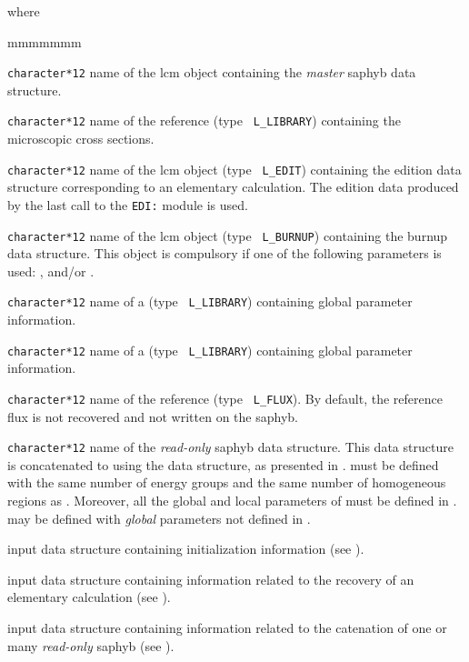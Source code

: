 \noindent where
\begin{ListeDeDescription}{mmmmmmm}

\item[\dusa{SAPNAM}] {\tt character*12} name of the {\sc lcm} object containing the
{\sl master} {\sc saphyb} data structure.

\item[\dusa{HMIC}] {\tt character*12} name of the reference  (type {\tt
L\_LIBRARY}) containing the microscopic cross sections.

\item[\dusa{EDINAM}] {\tt character*12} name of the {\sc lcm} object (type {\tt
L\_EDIT}) containing the {\sc edition} data structure corresponding to an elementary
calculation. The {\sc edition} data produced by the last call to the {\tt EDI:} module
is used.

\item[\dusa{BRNNAM}] {\tt character*12} name of the {\sc lcm} object (type {\tt
L\_BURNUP}) containing the {\sc burnup} data structure. This object is compulsory if one
of the following parameters is used: ,  and/or .

\item[\dusa{HMIC1}] {\tt character*12} name of a  (type {\tt
L\_LIBRARY}) containing global parameter information.

\item[\dusa{HMIC2}] {\tt character*12} name of a  (type {\tt
L\_LIBRARY}) containing global parameter information.

\item[\dusa{FLUNAM}] {\tt character*12} name of the reference  (type {\tt
L\_FLUX}). By default, the reference flux is not recovered and not written on the {\sc saphyb}.

\item[\dusa{SAPRHS}] {\tt character*12} name of the {\sl read-only} {\sc saphyb} data structure. This
data structure is concatenated to  using the  data structure,
as presented in .  must be defined with the same number of energy
groups and the same number of homogeneous regions as . Moreover, all the
global and local parameters of  must be defined in . 
may be defined with {\sl global} parameters not defined in .

\item[\dusa{saphyb\_data1}] input data structure containing initialization information (see ).

\item[\dusa{saphyb\_data2}] input data structure containing information related to the recovery of an
elementary calculation (see ).

\item[\dusa{saphyb\_data3}] input data structure containing information related to the catenation of one or many
{\sl read-only} {\sc saphyb} (see ).

\end{ListeDeDescription}

